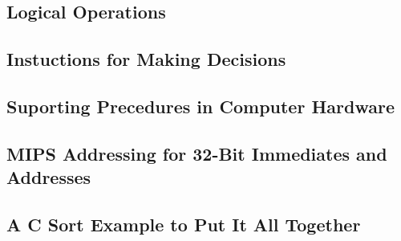 \subsection{Logical Operations}
\subsection{Instuctions for Making Decisions}
\subsection{Suporting Precedures in Computer Hardware}
\subsection{MIPS Addressing for 32-Bit Immediates and Addresses}
\subsection{A C Sort Example to Put It All Together}